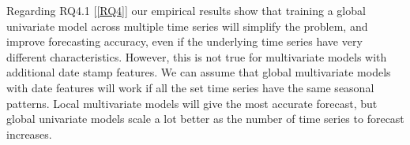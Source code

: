 
Regarding RQ4.1 [\ref{RQ4}] our empirical results show that training a global univariate model
across multiple time series will simplify the problem, and improve forecasting accuracy, even if the underlying time series
have very different characteristics.
However, this is not true for multivariate models with additional date stamp features.
We can assume that global multivariate models with date features will work if
all the set time series have the same seasonal patterns.
Local multivariate models will give the most accurate forecast, but global univariate
models scale a lot better as the number of time series to forecast increases.



